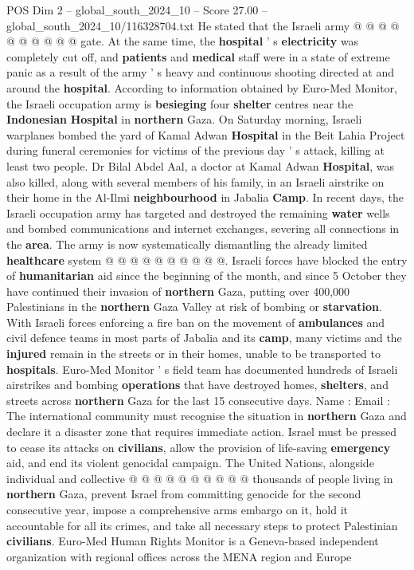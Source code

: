 \begin{textsample}{POS Dim 2 – global\_south\_2024\_10 – Score 27.00 – global\_south\_2024\_10/116328704.txt}
He stated that the Israeli army @ @ @ @ @ @ @ @ @ @ gate.
At the same time, the \textbf{hospital} ' s \textbf{electricity} was completely cut off, and \textbf{patients} and \textbf{medical} staff were in a state of extreme panic as a result of the army ' s heavy and continuous shooting directed at and around the \textbf{hospital}.
According to information obtained by Euro-Med Monitor, the Israeli occupation army is \textbf{besieging} four \textbf{shelter} centres near the \textbf{Indonesian} \textbf{Hospital} in \textbf{northern} Gaza.
On Saturday morning, Israeli warplanes bombed the yard of Kamal Adwan \textbf{Hospital} in the Beit Lahia Project during funeral ceremonies for victims of the previous day ' s attack, killing at least two people.
Dr Bilal Abdel Aal, a doctor at Kamal Adwan \textbf{Hospital}, was also killed, along with several members of his family, in an Israeli airstrike on their home in the Al-Ilmi \textbf{neighbourhood} in Jabalia \textbf{Camp}.
In recent days, the Israeli occupation army has targeted and destroyed the remaining \textbf{water} wells and bombed communications and internet exchanges, severing all connections in the \textbf{area}.
The army is now systematically dismantling the already limited \textbf{healthcare} system @ @ @ @ @ @ @ @ @ @.
Israeli forces have blocked the entry of \textbf{humanitarian} aid since the beginning of the month, and since 5 October they have continued their invasion of \textbf{northern} Gaza, putting over 400,000 Palestinians in the \textbf{northern} Gaza Valley at risk of bombing or \textbf{starvation}.
With Israeli forces enforcing a fire ban on the movement of \textbf{ambulances} and civil defence teams in most parts of Jabalia and its \textbf{camp}, many victims and the \textbf{injured} remain in the streets or in their homes, unable to be transported to \textbf{hospitals}.
Euro-Med Monitor ' s field team has documented hundreds of Israeli airstrikes and bombing \textbf{operations} that have destroyed homes, \textbf{shelters}, and streets across \textbf{northern} Gaza for the last 15 consecutive days.
Name : Email : The international community must recognise the situation in \textbf{northern} Gaza and declare it a disaster zone that requires immediate action.
Israel must be pressed to cease its attacks on \textbf{civilians}, allow the provision of life-saving \textbf{emergency} aid, and end its violent genocidal campaign.
The United Nations, alongside individual and collective @ @ @ @ @ @ @ @ @ @ thousands of people living in \textbf{northern} Gaza, prevent Israel from committing genocide for the second consecutive year, impose a comprehensive arms embargo on it, hold it accountable for all its crimes, and take all necessary steps to protect Palestinian \textbf{civilians}.
Euro-Med Human Rights Monitor is a Geneva-based independent organization with regional offices across the MENA region and Europe

\end{textsample}
